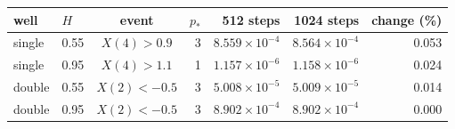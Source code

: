 \begin{tabular}{llcrrrr}\toprule
well & $H$ & event & $p_*$ & 512 steps & 1024 steps & change (\%)\\\midrule
single & 0.55 & $X(4)>0.9$ & 3 & $8.559\times10^{-4}$ & $8.564\times10^{-4}$ & 0.053\\
single & 0.95 & $X(4)>1.1$ & 1 & $1.157\times10^{-6}$ & $1.158\times10^{-6}$ & 0.024\\
double & 0.55 & $X(2)<-0.5$ & 3 & $5.008\times10^{-5}$ & $5.009\times10^{-5}$ & 0.014\\
double & 0.95 & $X(2)<-0.5$ & 3 & $8.902\times10^{-4}$ & $8.902\times10^{-4}$ & 0.000\\
\bottomrule\end{tabular}
